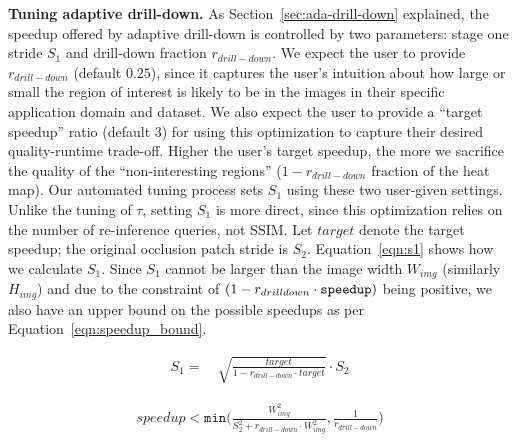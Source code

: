 \vspace{2mm}
\noindent \textbf{Tuning adaptive drill-down.}
As Section~\ref{sec:ada-drill-down} explained, the speedup offered by adaptive drill-down is controlled by two parameters: stage one stride $S_1$ and drill-down fraction $r_{drill-down}$. We expect the user to provide $r_{drill-down}$ (default $0.25$), since it captures the user's intuition about how large or small the region of interest is likely to be in the images in their specific application domain and dataset. We also expect the user to provide a ``target speedup'' ratio (default $3$) for using this optimization to capture their desired quality-runtime trade-off. Higher the user's target speedup, the more we sacrifice the quality of the ``non-interesting regions'' ($1 - r_{drill-down}$ fraction of the heat map). Our automated tuning process sets $S_1$ using these two user-given settings. Unlike the tuning of $\tau$, setting $S_1$ is more direct, since this optimization relies on the number of re-inference queries, not SSIM. Let $\mathit{target}$ denote the target speedup; the original occlusion patch stride is $S_2$. Equation~\ref{eqn:s1} shows how we calculate $S_1$. Since $S_1$ cannot be larger than the image width $W_{img}$ (similarly $H_{img}$) and due to the constraint of $(1-r_{drill\-down} \cdot \texttt{speedup})$ being positive, we also have an upper bound on the possible speedups as per Equation~\ref{eqn:speedup_bound}.

\begin{align}
\label{eqn:s1}
S_1 = &~ \sqrt{\frac{\mathit{target}}{1 - r_{drill-down} \cdot \mathit{target}}} \cdot S_2
\end{align}

\vspace{-2mm}
\begin{align}
\label{eqn:speedup_bound}
\mathit{speedup} < \texttt{min}\Bigg(\frac{W^2_{img}}{S^2_2+r_{drill-down} \cdot W^2_{img}}, \frac{1}{r_{drill-down}}\Bigg)
\end{align}


